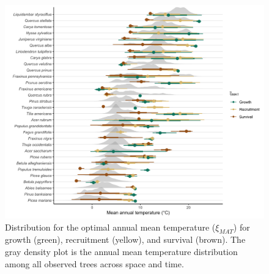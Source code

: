 \newpage

\hypertarget{fig:figsupp6_ch2}{%
\begin{figure}
\centering
\includegraphics{manuscript/figs/fig-matDist-1.png}
\caption[{Distribution for the optimal annual mean temperature
(\(\xi_{MAT}\)) for growth (green), recruitment (yellow), and survival
(brown).}]{Distribution for the optimal annual mean temperature
(\(\xi_{MAT}\)) for growth (green), recruitment (yellow), and survival
(brown). The gray density plot is the annual mean temperature
distribution among all observed trees across space and time.}
\label{fig:figsupp6_ch2}
\end{figure}
}

\newpage

